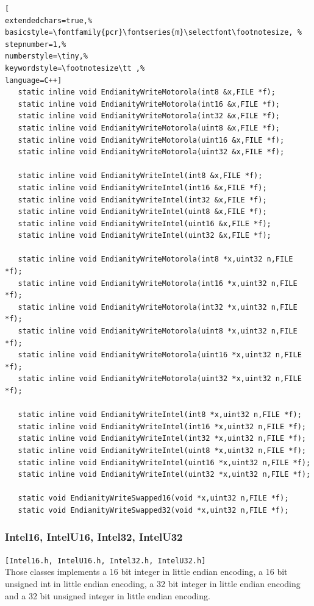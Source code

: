 \begin{lstlisting}[
extendedchars=true,%
basicstyle=\fontfamily{pcr}\fontseries{m}\selectfont\footnotesize, %
stepnumber=1,%
numberstyle=\tiny,%
keywordstyle=\footnotesize\tt ,%
language=C++]
   static inline void EndianityWriteMotorola(int8 &x,FILE *f);
   static inline void EndianityWriteMotorola(int16 &x,FILE *f);
   static inline void EndianityWriteMotorola(int32 &x,FILE *f);
   static inline void EndianityWriteMotorola(uint8 &x,FILE *f);
   static inline void EndianityWriteMotorola(uint16 &x,FILE *f);
   static inline void EndianityWriteMotorola(uint32 &x,FILE *f);

   static inline void EndianityWriteIntel(int8 &x,FILE *f);
   static inline void EndianityWriteIntel(int16 &x,FILE *f);
   static inline void EndianityWriteIntel(int32 &x,FILE *f);
   static inline void EndianityWriteIntel(uint8 &x,FILE *f);
   static inline void EndianityWriteIntel(uint16 &x,FILE *f);
   static inline void EndianityWriteIntel(uint32 &x,FILE *f);

   static inline void EndianityWriteMotorola(int8 *x,uint32 n,FILE *f);
   static inline void EndianityWriteMotorola(int16 *x,uint32 n,FILE *f);
   static inline void EndianityWriteMotorola(int32 *x,uint32 n,FILE *f);
   static inline void EndianityWriteMotorola(uint8 *x,uint32 n,FILE *f);
   static inline void EndianityWriteMotorola(uint16 *x,uint32 n,FILE *f);
   static inline void EndianityWriteMotorola(uint32 *x,uint32 n,FILE *f);

   static inline void EndianityWriteIntel(int8 *x,uint32 n,FILE *f);
   static inline void EndianityWriteIntel(int16 *x,uint32 n,FILE *f);
   static inline void EndianityWriteIntel(int32 *x,uint32 n,FILE *f);
   static inline void EndianityWriteIntel(uint8 *x,uint32 n,FILE *f);
   static inline void EndianityWriteIntel(uint16 *x,uint32 n,FILE *f);
   static inline void EndianityWriteIntel(uint32 *x,uint32 n,FILE *f);

   static void EndianityWriteSwapped16(void *x,uint32 n,FILE *f);
   static void EndianityWriteSwapped32(void *x,uint32 n,FILE *f);
\end{lstlisting}



\subsubsection{Intel16, IntelU16, Intel32, IntelU32}
\texttt{[Intel16.h, IntelU16.h, Intel32.h, IntelU32.h]}\\
Those classes implements a 16 bit integer in little endian encoding, a 16 bit unsigned int in little endian encoding, a 32 bit integer in little endian encoding and a 32 bit unsigned integer in little endian encoding.

